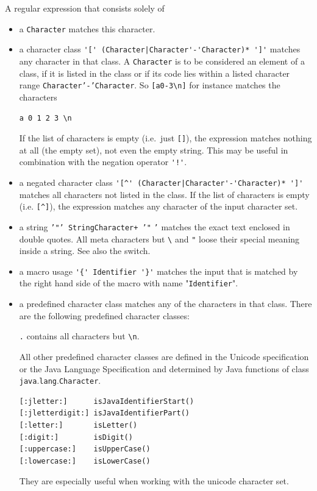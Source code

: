\documentclass[11pt]{scrartcl}
\begin{document}
A regular expression that consists solely of
\begin{itemize}
\item
  a \texttt{Character} matches this character.

\item
  a character class \verb:'[' (Character|Character'-'Character)* ']': matches
  any character in that class. A \texttt{Character} is to be considered an
  element of a class, if it is listed in the class or if its code lies within
  a listed character range \texttt{Character'-'Character}. So \verb+[a0-3\n]+
  for instance matches the characters

  \verb+a 0 1 2 3 \n+

  If the list of characters is empty (i.e.~just \verb+[]+), the expression
  matches nothing at all (the empty set), not even the empty string. This
  may be useful in combination with the negation operator \verb+'!'+.

\item 
  a negated character class \verb:'[^' (Character|Character'-'Character)* ']':
  matches all characters not listed in the class. If the list of characters
  is empty (i.e. \verb+[^]+), the expression matches any character of the
  input character set.

\item
  a string \texttt{'"' StringCharacter+ '"} \texttt{'} matches the exact
  text enclosed in double quotes. All meta characters but \verb+\+ and
  \texttt{"}  loose their special meaning inside a string. See also the
   switch.
    
\item
  a macro usage \verb+'{' Identifier '}'+ matches the input that is matched
  by the right hand side of the macro with name "\texttt{Identifier}".

\label{predefCharCl}
\item 
  a predefined character class matches any of
  the characters in that class. There are the following predefined character
  classes:

  \texttt{.}  contains all characters but \verb+\n+.
  
  All other predefined character classes are defined in the Unicode
  specification or the Java Language Specification and determined by
  Java functions of class
  \texttt{java}.\texttt{lang}.\texttt{Cha\-rac\-ter}.

\begin{verbatim}
[:jletter:]      isJavaIdentifierStart()
[:jletterdigit:] isJavaIdentifierPart()
[:letter:]       isLetter()
[:digit:]        isDigit()
[:uppercase:]    isUpperCase()
[:lowercase:]    isLowerCase()
\end{verbatim}

    They are especially useful when working with the unicode character set.


  \end{itemize}
\end{document}
